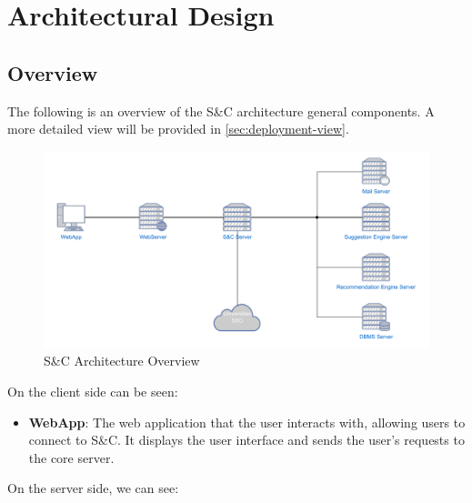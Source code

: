\chapter{Architectural Design}
\label{ch:architectural-design}%

\section{Overview}
\label{sec:overview}%

\par The following is an overview of the S\&C architecture general components. A more detailed view will be provided in
\ref{sec:deployment-view}.

\begin{figure}[H]
      \centering
      \includegraphics[width=1.0\textwidth]{Images/Overview_diagram.pdf}
      \caption{S\&C Architecture Overview}
      \label{fig:overview}
\end{figure}

\par On the client side can be seen:

\begin{itemize}
      \item \textbf{WebApp}: The web application that the user interacts with, allowing users to connect to S\&C.
            It displays the user interface and sends the user's requests to the core server.
\end{itemize}

\par On the server side, we can see:

